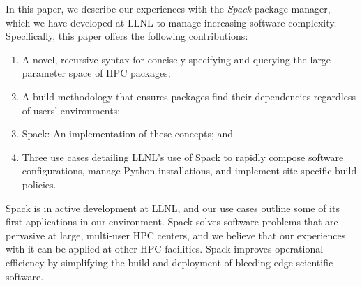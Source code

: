 In this paper, we describe our experiences with the {\it Spack} package manager,
which we have developed at LLNL to manage increasing software complexity.
Specifically, this paper offers the following contributions:
\begin{enumerate}
\item A novel, recursive syntax for concisely specifying and querying
      the large parameter space of HPC packages;
\item A build methodology that ensures packages find their dependencies
      regardless of users' environments; 
\item Spack: An implementation of these concepts; and
\item Three use cases detailing LLNL's use of Spack to rapidly compose
      software configurations, manage Python installations, and implement
      site-specific build policies.
\end{enumerate}

Spack is in active development at LLNL, and our use cases outline some of
its first applications in our environment.  Spack solves software problems 
that are pervasive at large, multi-user HPC centers, and we believe that our
experiences with it can be applied at other HPC facilities.  Spack improves
operational efficiency by simplifying the build and deployment of 
bleeding-edge scientific software.